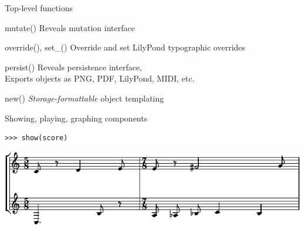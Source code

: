 \begin{frame}[fragile]{Top-level functions}
    \begin{block}{mutate()}
        Reveals mutation interface
    \end{block}
    \begin{block}{override(), set\_()}
        Override and set LilyPond typographic overrides
    \end{block}
    \begin{block}{persist()}
        Reveals persistence interface,\\
        Exports objects as PNG, PDF, LilyPond, MIDI, etc.
    \end{block}
    \begin{block}{new()}
        \emph{Storage-formattable} object templating
    \end{block}
\end{frame}

\begin{frame}[fragile]{Showing, playing, graphing components}

\begin{abjadbookoutput}
\begin{singlespacing}
\vspace{-0.5\baselineskip}
\begin{verbatim}
>>> show(score)
\end{verbatim}
\noindent\includegraphics[max width=\textwidth,]{assets/lilypond-d1594e6b9d2ea25db305672b28ed63b4.pdf}
\end{singlespacing}
\end{abjadbookoutput}

\end{frame}

